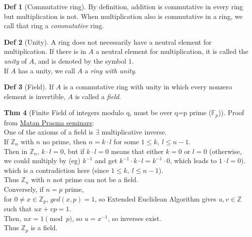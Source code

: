 \documentclass{article}
\theoremstyle{definition}
\newtheorem{definition}{Def}[section]
\newtheorem{theorem}[definition]{Thm}
\begin{document}
\begin{definition}[Commutative ring]
    By definition, addition is commutative in every ring but multiplication is not. When multiplication also is commutative in a ring, we call that ring a \emph{commutative} ring.
\end{definition}

\begin{definition}[Unity]
    A ring does not necessarily have a neutral element for multiplication. If there is in $A$ a neutral element for multiplication, it is called the \emph{unity} of $A$, and is denoted by the symbol $1$.
    \\
    If $A$ has a unity, we call $A$ a \emph{ring with unity}.
\end{definition}

\begin{definition}[Field]
    If $A$ is a commutative ring with unity in which every nonzero element is invertible, $A$ is called a \emph{field}.
\end{definition}

\begin{theorem}[Finite Field of integers modulo q, must be over q=p prime ($\mathbb{F}_p$)]
    Proof from \href{https://github.com/aragonzkresearch/blog/blob/main/pdf/Aragon_Math_Seminar.pdf}{Matan Prasma seminars}:\\
    One of the axioms of a field is $\exists$ multiplicative inverse.\\
    If $\mathbb{Z}_n$ with $n$ no prime, then $n= k \cdot l$ for some $1 \leq k,~l \leq n-1$.\\
    Then in $\mathbb{Z}_n$, $k \cdot l = 0$, but if $k \cdot l=0$ means that either $k=0$ or $l=0$ (otherwise, we could multiply by (eg) $k^{-1}$ and get $k^{-1} \cdot k \cdot l = k^{-1} \cdot 0$, which leads to $1 \cdot l = 0$).\\
    which is a contradiction here (since $1 \leq k,~l \leq n-1$).\\
    Thus $\mathbb{Z}_n$ with $n$ not prime can not be a field.\\
    Conversely, if $n = p$ prime,\\
    for $0 \neq x \in \mathbb{Z}_p$, $gcd(x, p)=1$, so Extended Euclidean Algorithm gives $u, v \in \mathbb{Z}$ such that $u x + v p = 1$.\\
    Then, $ux=1 \pmod p$, so $u=x^{-1}$, so inverses exist.\\
    Thus $\mathbb{Z}_p$ is a field.
\end{theorem}
\end{document}
